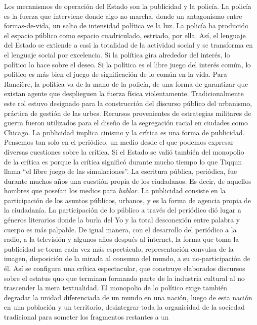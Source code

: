 \documentclass[
]{article}
\begin{document}
Los mecanismos de operación del Estado son la publicidad y la policía.
La policía es la fuerza que interviene donde algo no marcha, donde un
antagonismo entre formas-de-vida, un salto de intensidad política ve la
luz. La policía ha producido el espacio público como espacio
cuadriculado, estriado, por ella. Así, el lenguaje del Estado se
extiende a casi la totalidad de la actividad social y se transforma en
el lenguaje social por excelencia. Si la política gira alrededor del
interés, lo político lo hace sobre el deseo. Si la política es el libre
juego del interés común, lo político es más bien el juego de
significación de lo común en la vida. Para Rancière, la política va de
la mano de la policía, de una forma de garantizar que existan agente que
desplieguen la fuerza física violentamente. Tradicionalmente este rol
estuvo designado para la construcción del discurso público del
urbanismo, práctica de gestión de las urbes. Recursos provenientes de
estrategias militares de guerra fueron utilizados para el diseño de la
segregación racial en ciudades como Chicago. La publicidad implica
cinismo y la crítica es una forma de publicidad. Pensemos tan solo en el
periódico, un medio desde el que podemos expresar diversas cuestiones
sobre la crítica. Si el Estado se valió también del monopolio de la
crítica es porque la crítica significó durante mucho tiempo lo que
Tiqqun llama ``el libre juego de las simulaciones''. La escritura
pública, periódica, fue durante muchos años una cuestión propia de los
ciudadanos. Es decir, de aquellos hombres que poseían los medios para
\emph{hablar}. La publicidad consiste en la participación de los asuntos
públicos, urbanos, y es la forma de agencia propia de la ciudadanía. La
participación de lo público a través del periódico dió lugar a géneros
literarios donde la burla del Yo y la total desconexión entre palabra y
cuerpo es más palpable. De igual manera, con el desarrollo del periódico
a la radio, a la televisión y algunos años después al internet, la forma
que toma la publicidad se torna cada vez más espectáculo, representación
convulsa de la imagen, disposición de la mirada al consumo del mundo, a
su no-participación de él. Así se configura una crítica espectacular,
que construye elaborados discursos sobre el estatus quo que terminan
formando parte de la industria cultural al no trascender la mera
textualidad. El monopolio de lo político exige también degradar la
unidad diferenciada de un mundo en una nación, luego de esta nación en
una población y un territorio, desintegrar toda la organicidad de la
sociedad tradicional para someter los fragmentos restantes a un
\end{document}
